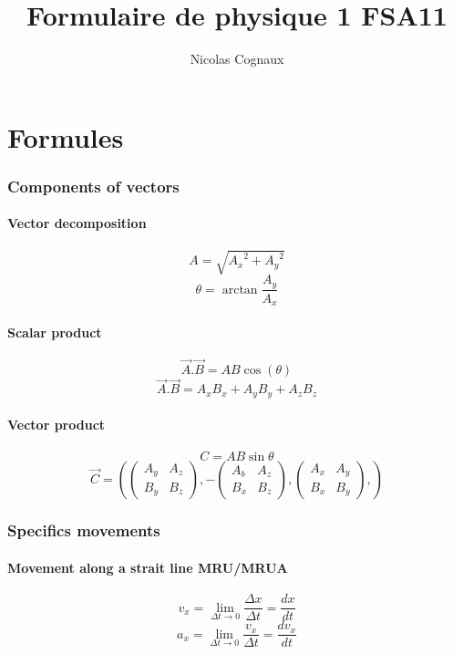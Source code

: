 \documentclass[a4paper,10pt]{article}
\title{Formulaire de physique 1 FSA11}
\author{Nicolas Cognaux}
\begin{document}
\maketitle

\newpage
\part{Formules}

\section{Components of vectors}
\subsection{Vector decomposition}
\[ A = \sqrt{{A_x}^2 + {A_y}^2} \]
\[ \theta = \arctan{\frac{A_y}{A_x}} \]
\subsection{Scalar product}
\[ \vec{A}.\vec{B} = AB\cos(\theta) \]
\[ \vec{A}.\vec{B} = A_x B_x + A_y B_y + A_z B_z \]

\subsection{Vector product}
\[ C = AB\sin{\theta} \]
\[ \vec{C} = \left( \begin{pmatrix}
	  A_y&A_z \\
	  B_y&B_z
          \end{pmatrix}, - \begin{pmatrix}
	  A_b&A_z \\
	  B_x&B_z
          \end{pmatrix}, \begin{pmatrix}
	  A_x&A_y \\
	  B_x&B_y
          \end{pmatrix},\right)
\]

\section{Specifics movements}
\subsection{Movement along a strait line MRU/MRUA}
\[ v_x = \displaystyle {\lim_{\Delta t \rightarrow 0 }} \frac{\Delta x}{\Delta t} = \frac{dx}{dt} \]
\[ a_x = \displaystyle {\lim_{\Delta t \rightarrow 0 }} \frac{v_x}{\Delta t} = \frac{dv_x}{dt} \]
\end{document}
